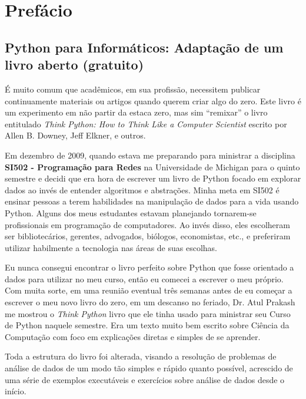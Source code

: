 
\chapter{Prefácio}

\section*{Python para Informáticos: Adaptação de um livro aberto (gratuito)}

É muito comum que acadêmicos, em sua profissão, necessitem publicar continuamente 
materiais ou artigos quando querem criar algo do zero. 
Este livro é um experimento em não partir da estaca zero, mas sim ``remixar''
o livro entitulado \emph{Think Python: How to Think Like
a Computer Scientist} escrito por Allen B. Downey, Jeff Elkner, e outros.

Em dezembro de 2009, quando estava me preparando para ministrar a disciplina
{\bf SI502 - Programação para Redes} na Universidade de Michigan
para o quinto semestre e decidi que era hora de escrever um livro de Python 
focado em explorar dados ao invés de entender algoritmos e 
abstrações.
Minha meta em SI502 é ensinar pessoas a terem habilidades na manipulação de dados 
para a vida usando Python.  Alguns dos meus estudantes estavam planejando tornarem-se 
profissionais em programação de computadores.  Ao invés disso, eles
escolheram ser bibliotecários, gerentes, advogados, biólogos, economistas, etc., 
e preferiram utilizar habilmente a tecnologia nas áreas de suas escolhas.

Eu nunca consegui encontrar o livro perfeito sobre Python que fosse orientado a dados
para utilizar no meu curso, então eu comecei a escrever o meu próprio. Com muita sorte, em 
uma reunião eventual três semanas antes de eu começar a escrever o meu novo livro do zero, 
em um descanso no feriado, Dr. Atul Prakash me mostrou o \emph{Think Python} livro que ele tinha
usado para ministrar seu Curso de Python naquele semestre.
Era um texto muito bem escrito sobre Ciência da Computação com foco em
explicações diretas e simples de se aprender.

Toda a estrutura do livro foi alterada, visando a resolução de problemas de análise de 
dados de um modo tão simples e rápido quanto possível, acrescido de uma série de exemplos 
executáveis e exercícios sobre análise de dados desde o início.

